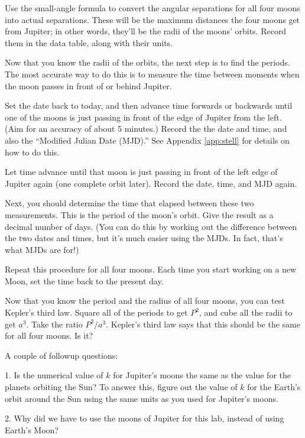 \vskip 1in

Use the small-angle formula to convert the angular separations
for all four moons into actual separations.  These will be the
maximum distances the four moons get from Jupiter; in other words,
they'll be the radii of the moons' orbits.  Record them in the data table,
along with their units.

Now that you know the radii of the orbits, the next step is to find the
periods.  The most accurate way to do this is to measure the time between
moments when the moon passes in front of or behind Jupiter.

Set the date back to today, and then advance time
forwards or backwards until one of the moons is just
passing in front of the edge of Jupiter from the left.  (Aim for
an accuracy of about 5 minutes.)  Record
the the date and time, and also the ``Modified Julian Date (MJD).''
See Appendix \ref{app:stell} for details on how to do this.

Let time advance until that moon
is just passing in front of the left edge of Jupiter again (one complete
orbit later).  Record the date, time, and MJD again.  

Next, you should determine the time that elapsed
between these two measurements.  This is the period of the moon's orbit.
Give the result as a decimal number of days. (You can do this by working
out the difference between the two dates and times, but it's much easier
using the MJDs. In fact, that's what MJDs are for!)

Repeat this procedure for all four moons. Each time you start working on a
new Moon, set the time back to the present day.

Now that you know the period and the radius of all four moons,
you can test Kepler's third law.  Square all of the periods to get $P^2$,
and cube all the radii to get $a^3$.  Take the ratio $P^2/a^3$.
Kepler's third law says that this should be the same for all four
moons.  Is it?

\vskip 1in

A couple of followup questions:

1. Is the numerical value of $k$ for Jupiter's moons the same
as the value for the planets orbiting the Sun?  To answer this,
figure out the value of $k$ for the Earth's orbit around the
Sun using the same units as you used for Jupiter's moons.

\vskip 3in

2. Why did we have to use the moons of Jupiter for this lab,
instead of using Earth's Moon?

